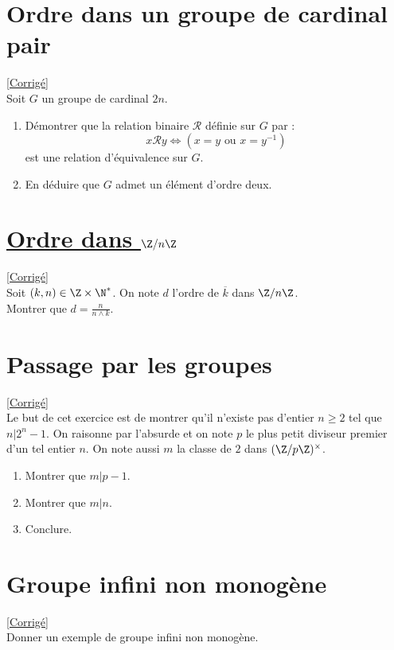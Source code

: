 \documentclass[8pt]{book}
\begin{document}
	\section{Ordre dans un groupe de cardinal pair }
	\label{Ordre dans un groupe de cardinal pair}
	\textcolor{blue}{\hyperref[Ordre dans un groupe de cardinal pair corrigé]{[Corrigé]}}\\
	Soit $G$ un groupe de cardinal $2n$.
	\begin{enumerate}
		\item Démontrer que la relation binaire $\mathcal R$ définie sur $G$ par :
		$$x\mathcal Ry\iff (x=y\text{ ou }x=y^{-1})$$
		est une relation d'équivalence sur $G$.
		\item En déduire que $G$ admet un élément d'ordre deux.
	\end{enumerate}
	
	\section{\underline{Ordre dans $\Z/n\Z$} }
	\label{Ordre dans Z/nZ}
	\textcolor{blue}{\hyperref[Ordre dans Z/nZ corrigé]{[Corrigé]}}\\
	Soit $(k,n)\in \Z\times \N^*$. On note $d$ l'ordre de $\overline{k}$ dans $\Z/n\Z$.\\
	Montrer que $d=\displaystyle\frac{n}{n\land k}$.
	
	\section{Passage par les groupes }
	\label{Passage par les groupes}
	\textcolor{blue}{\hyperref[Passage par les groupes corrigé]{[Corrigé]}}\\
	Le but de cet exercice est de montrer qu'il n'existe pas d'entier $n\geq 2$ tel que $n|2^n-1$. On raisonne par l'absurde et on note $p$ le plus petit diviseur premier d'un tel entier $n$. On note aussi $m$ la classe de $2$ dans $(\Z/p\Z)^\times$.
	\begin{enumerate}
		\item Montrer que $m|p-1$.
		\item Montrer que $m|n$.
		\item Conclure.
	\end{enumerate}
	
	\section{Groupe infini non monogène }
	\label{Groupe infini non monogène}
	\textcolor{blue}{\hyperref[Groupe infini non monogène corrigé]{[Corrigé]}}\\
	Donner un exemple de groupe infini non monogène.
	
\end{document}

